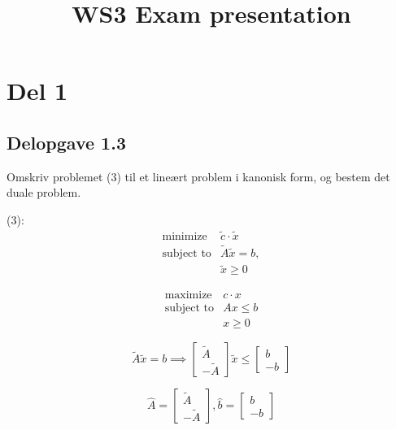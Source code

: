 \documentclass{article}
\title{WS3 Exam presentation}
\begin{document}
\section{Del 1}
\subsection{Delopgave 1.3}
Omskriv problemet (3) til et line\ae rt problem i kanonisk form, og bestem det duale problem.

(3):
\begin{equation}
    \begin{array}{ll}
        \text{minimize}   & \tilde{c} \cdot \tilde{x} \\
        \text{subject to} & \tilde{A}\tilde{x} = b, \\
                          & \tilde{x} \geq 0
    \end{array}
\end{equation}

\begin{equation}
    \begin{array}{ll}
        \text{maximize}   & c \cdot x \\
        \text{subject to} & Ax \leq b \\
                          & x \geq 0
    \end{array}
\end{equation}

\begin{equation}
    \tilde{A}\tilde{x} = b \implies
    \begin{bmatrix}
        \tilde{A} \\
        -\tilde{A}
    \end{bmatrix}
    \tilde{x} \leq
    \begin{bmatrix}
        b \\
        -b
    \end{bmatrix}
\end{equation}

\begin{equation}
    \hat{A} =
    \begin{bmatrix}
        \tilde{A} \\ -\tilde{A}
    \end{bmatrix},
    \hat{b} =
    \begin{bmatrix}
        b \\ -b
    \end{bmatrix}
\end{equation}
\end{document}

